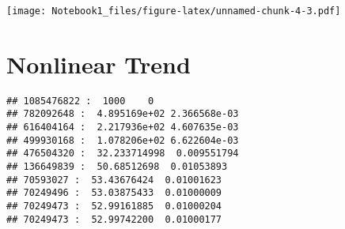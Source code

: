 \documentclass[]{article}
\newenvironment{Shaded}{\begin{snugshade}}{\end{snugshade}}
\newcommand{\DataTypeTok}[1]{\textcolor[rgb]{0.13,0.29,0.53}{#1}}
\newcommand{\DecValTok}[1]{\textcolor[rgb]{0.00,0.00,0.81}{#1}}
\newcommand{\KeywordTok}[1]{\textcolor[rgb]{0.13,0.29,0.53}{\textbf{#1}}}
\newcommand{\NormalTok}[1]{#1}
\newcommand{\OperatorTok}[1]{\textcolor[rgb]{0.81,0.36,0.00}{\textbf{#1}}}
\newcommand{\OtherTok}[1]{\textcolor[rgb]{0.56,0.35,0.01}{#1}}
\newcommand{\StringTok}[1]{\textcolor[rgb]{0.31,0.60,0.02}{#1}}
\begin{document}
\texttt{[image: Notebook1\_files/figure-latex/unnamed-chunk-4-3.pdf]}

\hypertarget{nonlinear-trend}{%
\section{Nonlinear Trend}\label{nonlinear-trend}}

\begin{Shaded}
\end{Shaded}

\begin{verbatim}
## 1085476822 :  1000    0
## 782092648 :  4.895169e+02 2.366568e-03
## 616404164 :  2.217936e+02 4.607635e-03
## 499930168 :  1.078206e+02 6.622604e-03
## 476504320 :  32.233714998  0.009551794
## 136649839 :  50.68512698  0.01053893
## 70593027 :  53.43676424  0.01001623
## 70249496 :  53.03875433  0.01000009
## 70249473 :  52.99161885  0.01000204
## 70249473 :  52.99742200  0.01000177
\end{verbatim}
\end{document}
